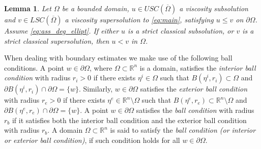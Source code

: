 \documentclass[12pt]{article}
\newtheorem{definition}[theorem]{Definition}
\newtheorem{lemma}[theorem]{Lemma}
\newenvironment{proof}[1][Proof]{\textbf{#1.} }{\ \rule{0.5em}{0.5em}}
\numberwithin{komcounter}{section}
\begin{document}
\begin{lemma}\label{le:comp-weak}
Let $\Omega$ be a bounded domain, $u \in USC(\overline{\Omega})$ a viscosity subsolution and $v \in LSC(\overline{\Omega})$ a viscosity supersolution to \eqref{eq:main}, satisfying $u \leq v$ on $\partial \Omega$.
Assume \eqref{eq:ass_deg_ellipt}.
If either $u$ is a strict classical subsolution, or $v$ is a strict classical supersolution,
then $u < v$ in $\Omega$.
\end{lemma}

%



When dealing with boundary estimates we make use of the following ball conditions.
A point $w \in \partial \Omega$, where $\Omega\subset \mathbb{R}^n$ is a domain,
satisfies the \emph{interior ball condition} with radius $r_i > 0$ if
there exists $\eta^i \in \Omega$ such that $B(\eta^i, r_i) \subset \Omega$ and
$\partial B(\eta^i, r_i) \cap \partial \Omega = \{w\}$.
%
Similarly, $w\in \partial \Omega$ satisfies the \emph{exterior ball condition}
with radius $r_e > 0$ if there exists $\eta^e \in \mathbb{R}^n \setminus \Omega$
such that $B(\eta^e, r_e) \subset \mathbb{R}^n \setminus \Omega$ and $\partial B(\eta^e, r_e) \cap \partial \Omega = \{w\}$.
%
A point $w \in \partial \Omega$ satisfies the \emph{ball condition} with radius $r_b$
if it satisfies both the interior ball condition and the exterior ball condition with radius $r_b$.
%
A domain $\Omega\subset \mathbb{R}^n$ is said to satisfy the \emph{ball condition (or interior or exterior ball condition)},
if such condition holds for all $w\in \partial \Omega$.
\end{document}
